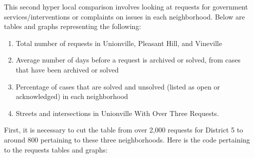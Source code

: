 \documentclass[
]{article}
\providecommand{\tightlist}{%
  \setlength{\itemsep}{0pt}\setlength{\parskip}{0pt}}
\begin{document}
This second hyper local comparison involves looking at requests for
government services/interventions or complaints on issues in each
neighborhood. Below are tables and graphs representing the following:

\begin{enumerate}
\def\labelenumi{\arabic{enumi}.}
\tightlist
\item
  Total number of requests in Unionville, Pleasant Hill, and Vineville
\item
  Average number of days before a request is archived or solved, from
  cases that have been archived or solved
\item
  Percentage of cases that are solved and unsolved (listed as open or
  acknowledged) in each neighborhood
\item
  Streets and intersections in Unionville With Over Three Requests.
\end{enumerate}

First, it is necessary to cut the table from over 2,000 requests for
District 5 to around 800 pertaining to these three neighborhoods. Here
is the code pertaining to the requests tables and graphs:
\end{document}
